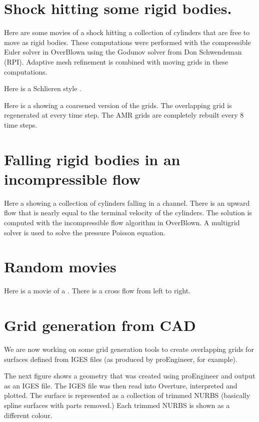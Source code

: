 \documentclass{article}
\begin{document}
\section{Shock hitting some rigid bodies.}

Here are some movies of a shock hitting a collection of cylinders that are free to
move as rigid bodies. These computations were performed with the compressible Euler solver in
OverBlown using the Godunov solver from Don Schwendeman (RPI). 
Adaptive mesh refinement is combined with moving grids in these computations.

Here is a Schlieren style .

Here is a  
showing a coarsened version of the grids. The overlapping grid
is regenerated at every time step. The AMR grids are completely rebuilt every 8 time steps.


\section{Falling rigid bodies in an incompressible flow}

Here a  showing 
a collection of cylinders falling in a channel. There is
an upward flow that is nearly equal to the terminal velocity of the cylinders.
The solution
is computed with the incompressible flow algorithm in OverBlown. A multigrid
solver is used to solve the pressure Poisson equation. 




\section{Random movies}

Here is a movie of a 
. There is a
cross flow from left to right.


\section{Grid generation from CAD}

We are now working on some grid generation tools to create overlapping
grids for surfaces defined from IGES files
(as produced by proEngineer, for example).

The next figure shows a geometry that was created using proEngineer and output
as an IGES file. The IGES file was then read into Overture, interpreted and plotted.
The surface is represented as a collection of trimmed NURBS (basically
spline surfaces with parts removed.) Each trimmed NURBS is shown as a different colour.
\end{document}
